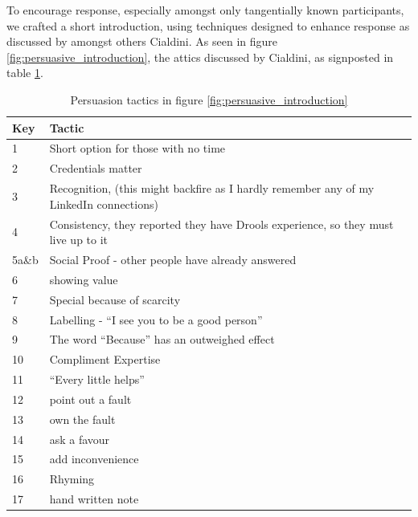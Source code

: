 To encourage response, especially amongst only tangentially known participants, we crafted a short introduction, using techniques designed to enhance response as discussed by amongst others Cialdini\cite{goldstein2008yes}.
As seen in figure \ref{fig:persuasive_introduction}, the attics discussed by Cialdini, as signposted in table \ref{table:persuasive_introduction}.
\begin{table}[h]
    \begin{center}
        \begin{tabular}{ |l | l |  } 
            \hline
            Key &  Tactic\\
            \hline
            1  & Short option for those with no time \\
            2  & Credentials matter \\
            3  & Recognition, (this might backfire as I hardly remember any of my LinkedIn connections) \\
            4  & Consistency, they reported they have Drools experience, so they must live up to it \\
            5a\&b  & Social Proof - other people have already answered \\
            6  & showing value \\
            7  & Special because of scarcity \\
            8  & Labelling - ``I see you to be a good person'' \\
            9  & The word ``Because'' has an outweighed effect \\
            10 & Compliment Expertise \\
            11 & ``Every little helps'' \\
            12 & point out a fault \\
            13 & own the fault \\
            14 & ask a favour \\
            15 & add inconvenience \\
            16 & Rhyming \\
            17 & hand written note \\
            \hline
        \end{tabular}
    \end{center}
    \caption{Persuasion tactics in figure \ref{fig:persuasive_introduction}}
    \label{table:persuasive_introduction}
\end{table}


